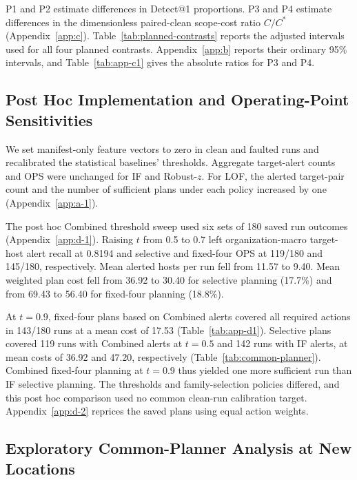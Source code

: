 \documentclass[sn-basic]{sn-jnl}%
\theoremstyle{thmstyleone}%
\theoremstyle{thmstyletwo}%
\theoremstyle{thmstylethree}%
\begin{document}
P1 and P2 estimate differences in Detect@1 proportions. P3 and P4 estimate differences in the dimensionless paired-clean scope-cost ratio \(C/C^{*}\) (Appendix~\ref{app:c}). Table~\ref{tab:planned-contrasts} reports the adjusted intervals used for all four planned contrasts. Appendix~\ref{app:b} reports their ordinary 95\% intervals, and Table~\ref{tab:app-c1} gives the absolute ratios for P3 and P4.

\subsection{Post Hoc Implementation and Operating-Point Sensitivities}\label{sec:operating-point-sensitivity}

We set manifest-only feature vectors to zero in clean and faulted runs and recalibrated the statistical baselines' thresholds. Aggregate target-alert counts and OPS were unchanged for IF and Robust-\(z\). For LOF, the alerted target-pair count and the number of sufficient plans under each policy increased by one (Appendix~\ref{app:a-1}).

The post hoc Combined threshold sweep used six sets of 180 saved run outcomes (Appendix~\ref{app:d-1}). Raising \(t\) from 0.5 to 0.7 left organization-macro target-host alert recall at 0.8194 and selective and fixed-four OPS at 119/180 and 145/180, respectively. Mean alerted hosts per run fell from 11.57 to 9.40. Mean weighted plan cost fell from 36.92 to 30.40 for selective planning (17.7\%) and from 69.43 to 56.40 for fixed-four planning (18.8\%).

At \(t=0.9\), fixed-four plans based on Combined alerts covered all required actions in 143/180 runs at a mean cost of 17.53 (Table~\ref{tab:app-d1}). Selective plans covered 119 runs with Combined alerts at \(t=0.5\) and 142 runs with IF alerts, at mean costs of 36.92 and 47.20, respectively (Table~\ref{tab:common-planner}). Combined fixed-four planning at \(t=0.9\) thus yielded one more sufficient run than IF selective planning. The thresholds and family-selection policies differed, and this post hoc comparison used no common clean-run calibration target. Appendix~\ref{app:d-2} reprices the saved plans using equal action weights.

\subsection{Exploratory Common-Planner Analysis at New Locations}\label{sec:new-location-planning}
\end{document}
